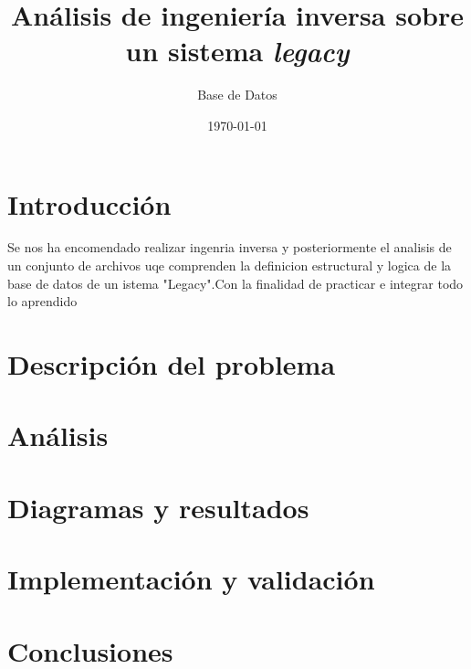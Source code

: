 \documentclass[10pt,letterpaper]{article}
\title{Análisis de ingeniería inversa sobre un sistema \textit{legacy}}
\author{Base de Datos }
\date{\today}
\begin{document}
\maketitle


\section{Introducción}
Se nos ha encomendado realizar ingenria inversa y posteriormente el analisis de un conjunto de archivos uqe comprenden
la definicion estructural y logica de la base de datos de un istema "Legacy".Con la finalidad de practicar e integrar todo lo 
aprendido 
\section{Descripción del problema}
\section{Análisis}
\section{Diagramas y resultados}
\section{Implementación y validación}
\section{Conclusiones}
\end{document}
